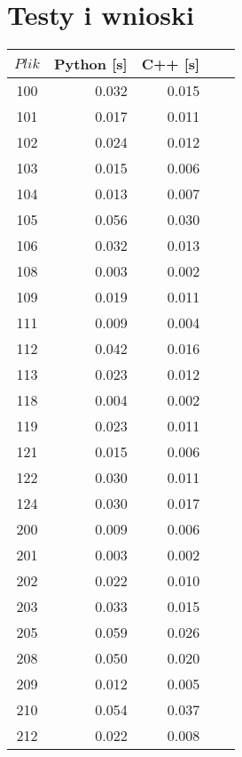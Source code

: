 \section{Testy i wnioski}
\label{sec_testy}

\begin{table}
	\centering
	\begin{tabular}{|c|r|r|r|r|}
		\hline
		$Plik$ & Python [s] & C++ [s] \\
		\hline
		100 & 0.032      & 0.015      \\
		\hline
		101 & 0.017      & 0.011      \\
		\hline
		102 & 0.024      & 0.012      \\
		\hline
		103 & 0.015      & 0.006      \\
		\hline
		104 & 0.013      & 0.007      \\
		\hline
		105 & 0.056      & 0.030      \\
		\hline
		106 & 0.032      & 0.013      \\
		\hline
		108 & 0.003      & 0.002      \\
		\hline
		109 & 0.019      & 0.011      \\
		\hline
		111 & 0.009      & 0.004      \\
		\hline
		112 & 0.042      & 0.016      \\
		\hline
		113 & 0.023      & 0.012      \\
		\hline
		118 & 0.004      & 0.002      \\
		\hline
		119 & 0.023      & 0.011      \\
		\hline
		121 & 0.015      & 0.006      \\
		\hline
		122 & 0.030      & 0.011      \\
		\hline
		124 & 0.030      & 0.017      \\
		\hline
		200 & 0.009      & 0.006      \\
		\hline
		201 & 0.003      & 0.002      \\
		\hline
		202 & 0.022      & 0.010      \\
		\hline
		203 & 0.033      & 0.015      \\
		\hline
		205 & 0.059      & 0.026      \\
		\hline
		208 & 0.050      & 0.020      \\
		\hline
		209 & 0.012      & 0.005      \\
		\hline
		210 & 0.054      & 0.037      \\
		\hline
		212 & 0.022      & 0.008      \\

\end{tabular}
\end{table}
